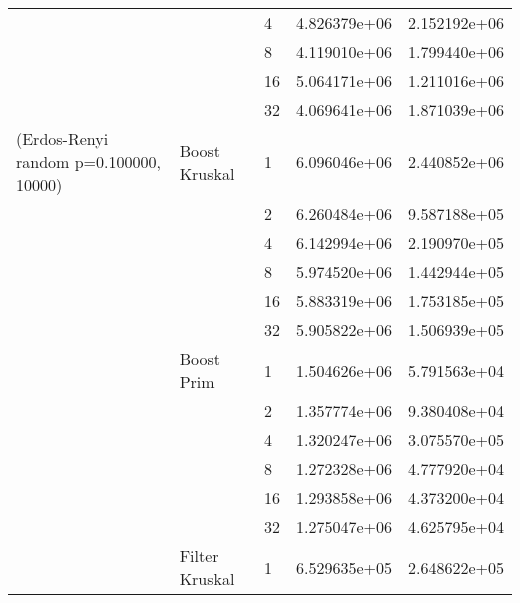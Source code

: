 \begin{tabular}{lllrr}
                                                       &                     & 4  &  4.826379e+06 &  2.152192e+06 \\
                                                       &                     & 8  &  4.119010e+06 &  1.799440e+06 \\
                                                       &                     & 16 &  5.064171e+06 &  1.211016e+06 \\
                                                       &                     & 32 &  4.069641e+06 &  1.871039e+06 \\
(Erdos-Renyi random p=0.100000, 10000) & Boost Kruskal & 1  &  6.096046e+06 &  2.440852e+06 \\
                                                       &                     & 2  &  6.260484e+06 &  9.587188e+05 \\
                                                       &                     & 4  &  6.142994e+06 &  2.190970e+05 \\
                                                       &                     & 8  &  5.974520e+06 &  1.442944e+05 \\
                                                       &                     & 16 &  5.883319e+06 &  1.753185e+05 \\
                                                       &                     & 32 &  5.905822e+06 &  1.506939e+05 \\
                                                       & Boost Prim & 1  &  1.504626e+06 &  5.791563e+04 \\
                                                       &                     & 2  &  1.357774e+06 &  9.380408e+04 \\
                                                       &                     & 4  &  1.320247e+06 &  3.075570e+05 \\
                                                       &                     & 8  &  1.272328e+06 &  4.777920e+04 \\
                                                       &                     & 16 &  1.293858e+06 &  4.373200e+04 \\
                                                       &                     & 32 &  1.275047e+06 &  4.625795e+04 \\
                                                       & Filter Kruskal & 1  &  6.529635e+05 &  2.648622e+05 \\

\end{tabular}
